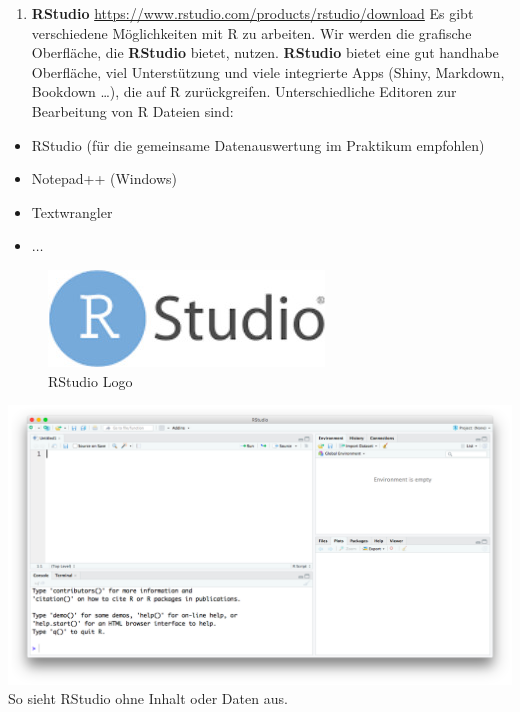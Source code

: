 \documentclass[]{book}
\providecommand{\tightlist}{%
  \setlength{\itemsep}{0pt}\setlength{\parskip}{0pt}}
\begin{document}
\begin{enumerate}
\def\labelenumi{\arabic{enumi}.}
\setcounter{enumi}{1}
\tightlist
\item
  \textbf{RStudio}
  \url{https://www.rstudio.com/products/rstudio/download} Es gibt
  verschiedene Möglichkeiten mit R zu arbeiten. Wir werden die grafische
  Oberfläche, die \textbf{RStudio} bietet, nutzen. \textbf{RStudio}
  bietet eine gut handhabe Oberfläche, viel Unterstützung und viele
  integrierte Apps (Shiny, Markdown, Bookdown \ldots{}), die auf R
  zurückgreifen. Unterschiedliche Editoren zur Bearbeitung von R Dateien
  sind:
\end{enumerate}

\begin{itemize}
\tightlist
\item
  RStudio (für die gemeinsame Datenauswertung im Praktikum empfohlen)
\item
  Notepad++ (Windows)
\item
  Textwrangler
\item
  \(\dots\)
\end{itemize}

\begin{figure}
\centering
\includegraphics{./img/download.jpg}
\caption{RStudio Logo}
\end{figure}

\includegraphics{./img/RStudio-look1.png} So sieht RStudio ohne Inhalt
oder Daten aus.
\end{document}
